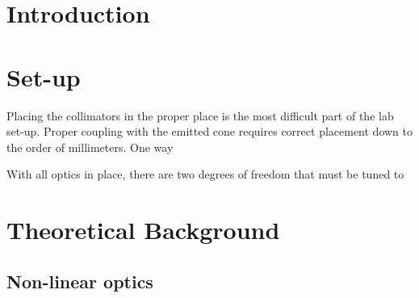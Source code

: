 \documentclass{article}
\begin{document}
\maketitle


\begin{tocbox}
	\tableofcontents
\end{tocbox}

\section{Introduction}

\section{Set-up}
Placing the collimators in the proper place is the most difficult part of the 
lab set-up. Proper coupling with the emitted cone requires correct placement 
down to the order of millimeters. One way 

With all optics in place, there are two degrees of freedom that must be tuned 
to 

\section{Theoretical Background}
\subsection{Non-linear optics}
\end{document}
